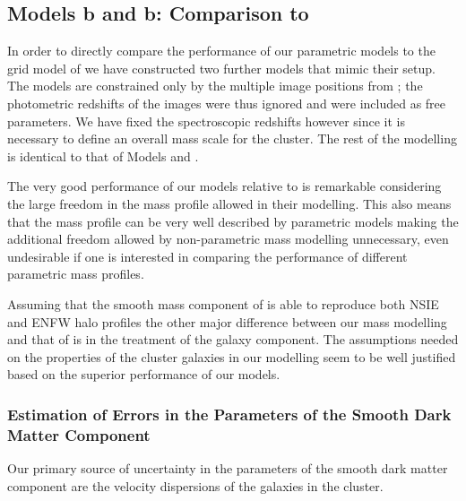 \documentclass[useAMS,usenatbib]{mn2e}
\newcounter{one}   \setcounter{one}{1}
\newcounter{two}   \setcounter{two}{2}
\begin{document}
\subsection{Models \mbox{b} and \mbox{b}: Comparison to \citet{broadhurst:05}}

In order to directly compare the performance of our parametric models
to the grid model of \citet{broadhurst:05} we have constructed two
further models that mimic their setup. The models are constrained only
by the multiple image positions from \citet{broadhurst:05}; the
photometric redshifts of the images were thus ignored and were
included as free parameters. We have fixed the spectroscopic redshifts
however since it is necessary to define an overall mass scale for the
cluster. The rest of the modelling is identical to that of Models
 and .

The very good performance of our models relative to
\citet{broadhurst:05} is remarkable considering the large freedom in
the mass profile allowed in their modelling. This also means that the
mass profile can be very well described by parametric models making
the additional freedom allowed by non-parametric mass modelling
unnecessary, even undesirable if one is interested in comparing the
performance of different parametric mass profiles.

Assuming that the smooth mass component of \citet{broadhurst:05} is
able to reproduce both NSIE and ENFW halo profiles the other major
difference between our mass modelling and that of
\citet{broadhurst:05} is in the treatment of the galaxy component. The
assumptions needed on the properties of the cluster galaxies in our
modelling seem to be well justified based on the superior performance
of our models.\\




\subsubsection{Estimation of Errors in the Parameters of the Smooth Dark
  Matter Component}
\label{sec:errors}

Our primary source of uncertainty in the parameters of the smooth dark
matter component are the velocity dispersions of the galaxies in the
cluster.
\end{document}
